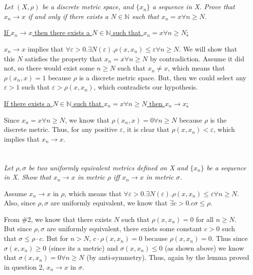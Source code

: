 \documentclass[]{article}
\newcommand{\naturals}{\mathbb{N}}
\begin{document}
	\section{}
		\textit{Let $(X, \rho)$ be a discrete metric space, and $\{x_n\}$ a sequence in X. Prove that $x_n \to x$ if and only if there exists a $N \in \naturals$ such that $x_n = x \forall n \geq N$.}

		\underline{If $x_n \to x$ then there exists a $N \in \naturals$ such that $x_n = x \forall n \geq N$:}

		$x_n \to x$ implies that $\forall \varepsilon > 0 . \exists N(\varepsilon) . \rho(x, x_n) \leq \varepsilon \forall n \geq N$. We will show that this $N$ satisfies the property that $x_n = x \forall n \geq N$ by contradiction. Assume it did not, so there would exist some $n \geq N$ such that $x_n \neq x$, which means that $\rho(x_n, x) = 1$ because $\rho$ is a discrete metric space. But, then we could select any $\varepsilon > 1$ such that $\varepsilon > \rho(x, x_n)$, which contradicts our hypothesis. 

		\underline{If there exists a $N \in \naturals$ such that $x_n = x \forall n \geq N$ then $x_n \to x$:}

		Since $x_n = x \forall n \geq N$, we know that $\rho(x_n, x) = 0 \forall n \geq N$ because $\rho$ is the discrete metric. Thus, for any positive $\varepsilon$, it is clear that $\rho(x, x_n) < \varepsilon$, which implies that $x_n \to x$. 

	\section{}
		\textit{Let $\rho, \sigma$ be two uniformly equivalent metrics defined on X and $\{x_n\}$ be a sequence in X. Show that $x_n \to x$ in metric $\rho$ iff $x_n \to x$ in metric $\sigma$.}

		

		Assume $x_n \to x$ in $\rho$, which means that $\forall \varepsilon > 0 . \exists N(\varepsilon) . \rho(x, x_n) \leq \varepsilon \forall n \geq N$. Also, since $\rho, \sigma$ are uniformly equivalent, we know that $\exists c > 0 . c \sigma \leq \rho$. 

		From \#2, we know that there exists $N$ such that $\rho(x, x_n) = 0$ for all $n \geq N$. But since $\rho, \sigma$ are uniformly equivalent, there exists some constant $c > 0$ such that $\sigma \leq \rho \cdot c$. But for $n > N$, $c \cdot \rho(x, x_n) = 0$ because $\rho(x, x_n) = 0$. Thus since $\sigma(x, x_n) \geq 0$ (since its a metric) and  $\sigma(x, x_n) \leq 0$ (as shown above) we know that $\sigma(x, x_n) = 0 \forall n \geq N$ (by anti-symmetry). Thus, again by the lemma proved in question 2, $x_n \to x$ in $\sigma$. 

\end{document}
